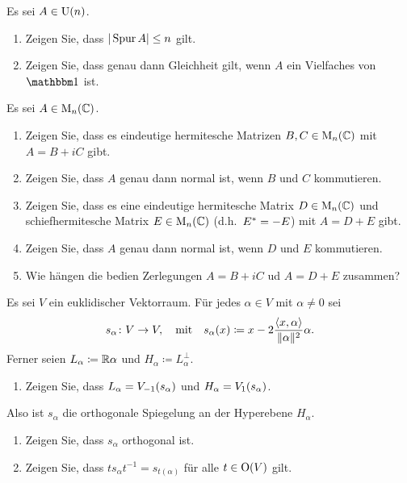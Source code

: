 \documentclass[a4paper, 10pt]{scrartcl}
\begin{document}
\begin{question}
  Es sei $A \in \Unitary{n}$.
  \begin{enumerate}
    \item
      Zeigen Sie, dass $|\tr A| \leq n$ gilt.
    \item
      Zeigen Sie, dass genau dann Gleichheit gilt, wenn $A$ ein Vielfaches von $\Id$ ist.
  \end{enumerate}
\end{question}





\begin{question}
  Es sei $A \in \matrices{n}{\Complex}$.
  \begin{enumerate}
    \item
      Zeigen Sie, dass es eindeutige hermitesche Matrizen $B, C \in \matrices{n}{\Complex}$ mit $A = B + i C$ gibt.
    \item
      Zeigen Sie, dass $A$ genau dann normal ist, wenn $B$ und $C$ kommutieren.
    \item
      Zeigen Sie, dass es eine eindeutige hermitesche Matrix $D \in \matrices{n}{\Complex}$ und schiefhermitesche Matrix $E \in \matrices{n}{\Complex}$ (d.h.\ $\madj{E} = -E$) mit $A = D + E$ gibt.
    \item
      Zeigen Sie, dass $A$ genau dann normal ist, wenn $D$ und $E$ kommutieren.
    \item
      Wie hängen die bedien Zerlegungen $A = B + iC$ ud $A = D + E$ zusammen?
  \end{enumerate}
\end{question}





\begin{question}[subtitle = Spiegelungen]
  Es sei $V$ ein euklidischer Vektorraum.
  Für jedes $\alpha \in V$ mit $\alpha \neq 0$ sei
  \[
            s_\alpha
    \colon  V
    \to     V,
    \quad\text{mit}\quad
              s_\alpha(x)
    \coloneqq x - 2 \frac{\bil{x}{\alpha}}{\|\alpha\|^2} \alpha.
  \]
  Ferner seien $L_\alpha \coloneqq \Real \alpha$ und $H_\alpha \coloneqq L_\alpha^\perp$.
  \begin{enumerate}
    \item
      Zeigen Sie, dass $L_\alpha = \eigenspace{V}{s_\alpha}{-1}$ und $H_\alpha = \eigenspace{V}{s_\alpha}{1}$.
  \end{enumerate}
  Also ist $s_\alpha$ die orthogonale Spiegelung an der Hyperebene $H_\alpha$.
  \begin{enumerate}[resume]
    \item
      Zeigen Sie, dass $s_\alpha$ orthogonal ist.
    \item
      Zeigen Sie, dass $t s_\alpha t^{-1} = s_{t(\alpha)}$ für alle $t \in \Orthogonal{V}$ gilt.
  \end{enumerate}
\end{question}
\end{document}

